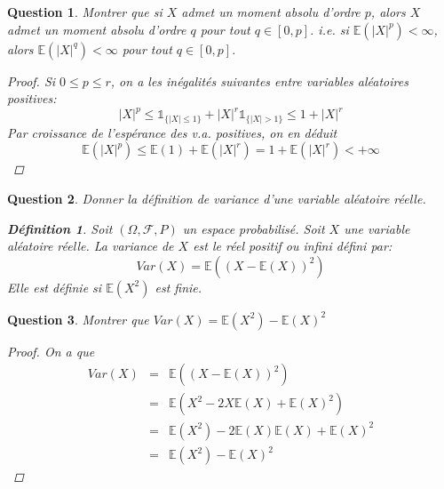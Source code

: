 \documentclass{article}
\theoremstyle{plain}
\newtheorem{question}{Question}
\theoremstyle{definition}
\newtheorem{definition}{Définition}
\begin{document}
\begin{question}
	Montrer que si $X$ admet un moment absolu d'ordre $p$, alors $X$ admet un moment absolu d'ordre $q$ pour tout $q \in [0, p]$.
	i.e. si $\mathbb{E} (|X|^p) < \infty$, alors $\mathbb{E} (|X|^q) < \infty$ pour tout $q \in [0, p]$.
	\begin{proof}
		Si $0 \leq p \leq r$, on a les inégalités suivantes entre variables aléatoires positives:
		$$|X|^p \leq \mathds{1}_{\{|X|\leq 1\}} + |X|^r\mathds{1}_{\{|X|>1\}} \leq 1 + |X|^r$$
		Par croissance de l’espérance des v.a. positives, on en déduit
		$$\mathbb{E}(|X|^p) \leq \mathbb{E}(1) + \mathbb{E}(|X|^r) = 1 + \mathbb{E}(|X|^r) < +\infty$$
	\end{proof}
\end{question}

\begin{question}
	Donner la définition de variance d'une variable aléatoire réelle.
	\begin{definition}
		Soit $(\Omega, \mathscr{F}, P)$ un espace probabilisé. Soit $X$ une variable aléatoire réelle. La variance de $X$ est le réel positif ou infini défini par:
		\begin{equation*}
			Var(X) = \mathbb{E} ((X - \mathbb{E} (X))^2)
		\end{equation*}
		Elle est définie si $\mathbb{E} (X^2)$ est finie.
	\end{definition}
\end{question}

\begin{question}
	Montrer que $Var(X) = \mathbb{E} (X^2) - \mathbb{E} (X)^2$
	\begin{proof}
		On a que
		\begin{eqnarray*}
			Var(X) &=& \mathbb{E} ((X - \mathbb{E} (X))^2) \\
			&=& \mathbb{E} (X^2 - 2X\mathbb{E} (X) + \mathbb{E} (X)^2) \\
			&=& \mathbb{E} (X^2) - 2\mathbb{E} (X)\mathbb{E} (X) + \mathbb{E} (X)^2 \\
			&=& \mathbb{E} (X^2) - \mathbb{E} (X)^2
		\end{eqnarray*}
	\end{proof}
\end{question}
\end{document}
